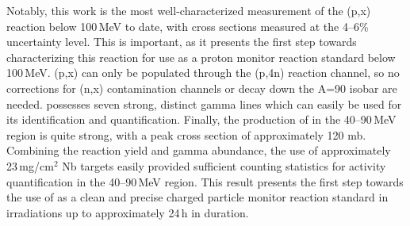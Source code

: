 

Notably, this work is the most well-characterized measurement of the (p,x) reaction below 100\,MeV to date, with cross sections measured  at the 4--6\% uncertainty level.
This is important, as it presents the first step towards characterizing this reaction for use as a proton monitor reaction standard below 100\,MeV.
(p,x) can only be populated through the (p,4n) reaction channel, so no corrections for (n,x) contamination channels or decay down the A=90 isobar are needed.
  possesses seven strong, distinct gamma lines which can easily  be used for its identification and quantification.
Finally, the production of   in the 40--90\,MeV region is quite strong, with a peak cross section of approximately 120 mb.
Combining the reaction yield and gamma abundance, the use of approximately 23\,mg/cm$^2$ Nb targets easily provided sufficient counting statistics for activity quantification in the 40--90\,MeV region.
This result presents the first step towards the use of  as a clean and precise   charged particle monitor reaction standard in irradiations up to approximately 24\,h in duration.






